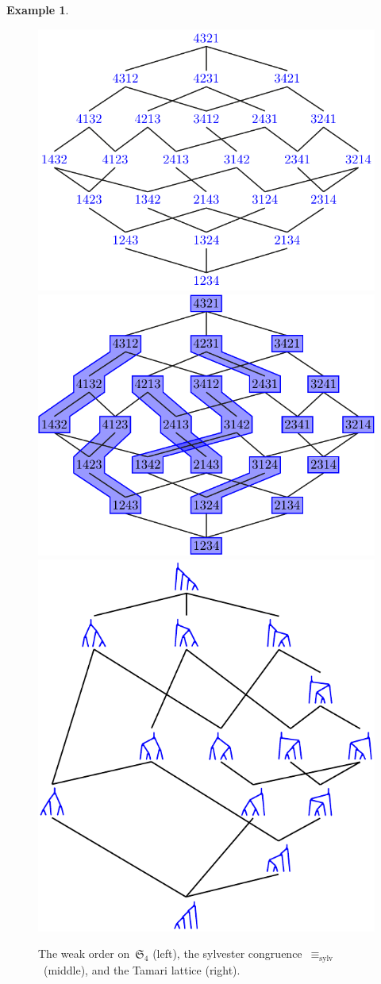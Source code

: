\documentclass{amsart}
\theoremstyle{definition}
\newtheorem{example}[theorem]{Example}
\newcommand{\f}[1]{{\mathfrak{#1}}} %
\begin{document}
\begin{example}
\label{exm:sylvesterCongruence}
%
\begin{figure}[b]
	\capstart
	\centerline{\includegraphics[scale=.6]{weakOrderLeft4} \; \includegraphics[scale=.6]{weakOrderCongruence4} \; \includegraphics[scale=.48]{TamariLattice4}}
	\caption{The weak order on~$\f{S}_4$ (left), the sylvester congruence~$\equiv_\textrm{sylv}$~(middle), and the Tamari lattice (right). \cite[Fig.~1 \& 2]{PilaudSantos-quotientopes}}
	\la
\end{figure}
\end{example}
\end{document}
